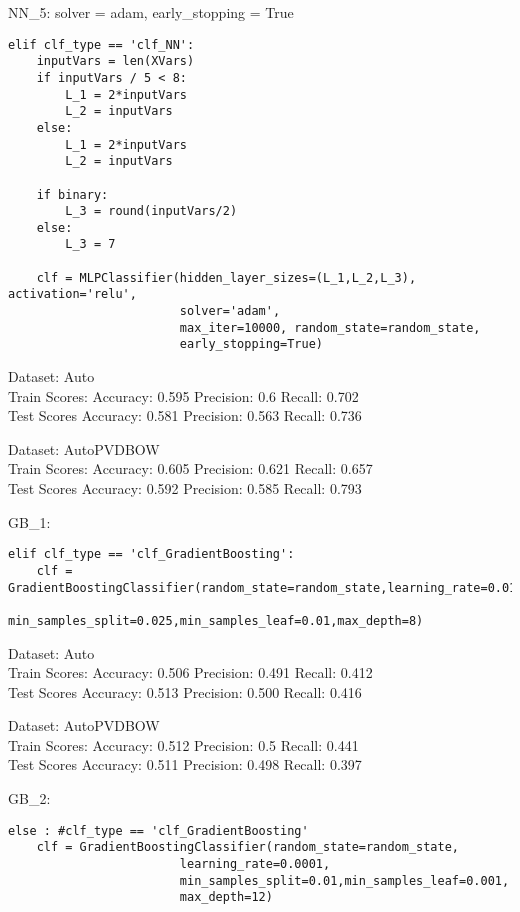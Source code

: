\documentclass[11pt,preprint, authoryear]{elsarticle}
\numberwithin{equation}{section}
\numberwithin{figure}{section}
\numberwithin{table}{section}
\begin{document}
NN\_5: solver = adam, early\_stopping = True

\begin{verbatim}
elif clf_type == 'clf_NN':
    inputVars = len(XVars)
    if inputVars / 5 < 8:
        L_1 = 2*inputVars
        L_2 = inputVars
    else:
        L_1 = 2*inputVars
        L_2 = inputVars

    if binary:
        L_3 = round(inputVars/2)
    else:
        L_3 = 7

    clf = MLPClassifier(hidden_layer_sizes=(L_1,L_2,L_3), activation='relu',
                        solver='adam',
                        max_iter=10000, random_state=random_state,
                        early_stopping=True)
\end{verbatim}

Dataset: Auto\\
Train Scores: Accuracy: 0.595 Precision: 0.6 Recall: 0.702\\
Test Scores Accuracy: 0.581 Precision: 0.563 Recall: 0.736

Dataset: AutoPVDBOW\\
Train Scores: Accuracy: 0.605 Precision: 0.621 Recall: 0.657\\
Test Scores Accuracy: 0.592 Precision: 0.585 Recall: 0.793

GB\_1:

\begin{verbatim}
elif clf_type == 'clf_GradientBoosting':
    clf = GradientBoostingClassifier(random_state=random_state,learning_rate=0.01,
                        min_samples_split=0.025,min_samples_leaf=0.01,max_depth=8)
\end{verbatim}

Dataset: Auto\\
Train Scores: Accuracy: 0.506 Precision: 0.491 Recall: 0.412\\
Test Scores Accuracy: 0.513 Precision: 0.500 Recall: 0.416

Dataset: AutoPVDBOW\\
Train Scores: Accuracy: 0.512 Precision: 0.5 Recall: 0.441\\
Test Scores Accuracy: 0.511 Precision: 0.498 Recall: 0.397

GB\_2:

\begin{verbatim}
else : #clf_type == 'clf_GradientBoosting'
    clf = GradientBoostingClassifier(random_state=random_state,
                        learning_rate=0.0001,
                        min_samples_split=0.01,min_samples_leaf=0.001,
                        max_depth=12)
\end{verbatim}
\end{document}
